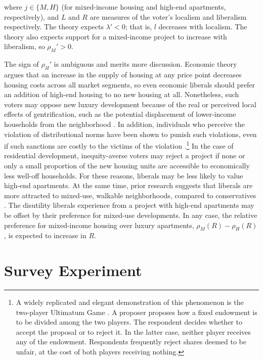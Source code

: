 \documentclass[article,11pt]{memoir}
\begin{document}
\noindent where $j \in \{M, H\}$ (for mixed-income housing and high-end apartments, respectively), and $L$ and $R$ are measures of the voter's localism and liberalism respectively.  The theory expects $\lambda' < 0$; that is, $l$ decreases with localism.  The theory also expects support for a mixed-income project to increase with liberalism, so $\rho_M' > 0$.  

The sign of $\rho_H'$ is ambiguous and merits more discussion.  Economic theory argues that an increase in the supply of housing at any price point decreases housing costs across all market segments, so even economic liberals should prefer an addition of high-end housing to no new housing at all.  Nonetheless, such voters may oppose new luxury development because of the real or perceived local effects of gentrification, such as the potential displacement of lower-income households from the neighborhood \citep{hankinson_when_2018}. In addition, individuals who perceive the violation of distributional norms have been shown to punish such violations, even if such sanctions are costly to the victims of the violation \citep{fehr_third-party_2004}.\footnote{A widely replicated and elegant demonstration of this phenomenon is the two-player Ultimatum Game \citep{henrich_does_2000}. A proposer proposes how a fixed endowment is to be divided among the two players. The respondent decides whether to accept the proposal or to reject it. In the latter case, neither player receives any of the endowment. Respondents frequently reject shares deemed to be unfair, at the cost of both players receiving nothing.}  In the case of residential development, inequity-averse voters may reject a project if none or only a small proportion of the new housing units are accessible to economically less well-off households. For these reasons, liberals may be less likely to value high-end apartments. At the same time, prior research suggests that liberals are more attracted to mixed-use, walkable neighborhoods, compared to conservatives \citep{lewis_complexity_2010}.  The disutility liberals experience from a project with high-end apartments may be offset by their preference for mixed-use developments.  In any case, the relative preference for mixed-income housing over luxury apartments, $\rho_M(R) - \rho_H(R)$, is expected to increase in $R$.

\section{Survey Experiment}\label{sec:exp}
\end{document}
